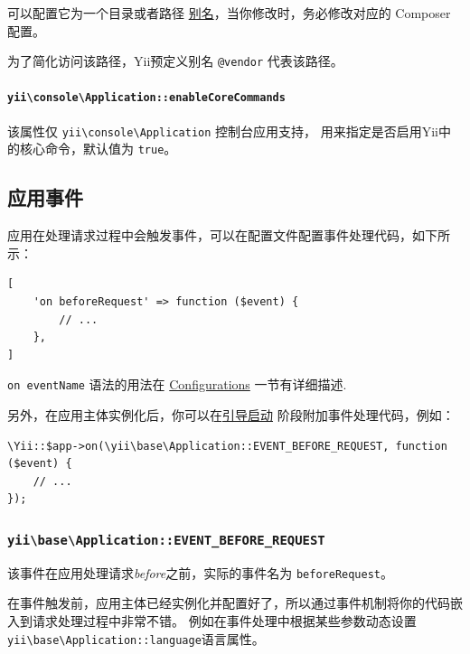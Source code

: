 可以配置它为一个目录或者路径 \hyperref[concept-aliases.md]{别名}，当你修改时，务必修改对应的 Composer 配置。

为了简化访问该路径，Yii预定义别名 \lstinline|@vendor| 代表该路径。

\paragraph{\texttt{yii{\allowbreak{}\textbackslash}console{\allowbreak{}\textbackslash}Application\allowbreak{}::\allowbreak{}enableCoreCommands} \label{structure-applications.md::enableCoreCommands}}
该属性仅 \texttt{yii{\allowbreak{}\textbackslash}console{\allowbreak{}\textbackslash}Application} 控制台应用支持， 用来指定是否启用Yii中的核心命令，默认值为 \lstinline|true|。

\subsection{应用事件 \label{structure-applications.md::application-events}}
应用在处理请求过程中会触发事件，可以在配置文件配置事件处理代码，如下所示：

\lstset{language=php}\begin{lstlisting}
[
    'on beforeRequest' => function ($event) {
        // ...
    },
]
\end{lstlisting}
\lstinline|on eventName| 语法的用法在 \hyperref[concept-configurations.md::configuration-format]{Configurations} 一节有详细描述.

另外，在应用主体实例化后，你可以在\hyperref[runtime-bootstrapping.md]{引导启动} 阶段附加事件处理代码，例如：

\lstset{language=php}\begin{lstlisting}
\Yii::$app->on(\yii\base\Application::EVENT_BEFORE_REQUEST, function ($event) {
    // ...
});
\end{lstlisting}
\subsubsection{\texttt{yii{\allowbreak{}\textbackslash}base{\allowbreak{}\textbackslash}Application\allowbreak{}::\allowbreak{}EVENT\_BEFORE\_REQUEST} \label{structure-applications.md::beforeRequest}}
该事件在应用处理请求\textit{before}之前，实际的事件名为 \lstinline|beforeRequest|。

在事件触发前，应用主体已经实例化并配置好了，所以通过事件机制将你的代码嵌入到请求处理过程中非常不错。
例如在事件处理中根据某些参数动态设置\texttt{yii{\allowbreak{}\textbackslash}base{\allowbreak{}\textbackslash}Application\allowbreak{}::\allowbreak{}language}语言属性。

